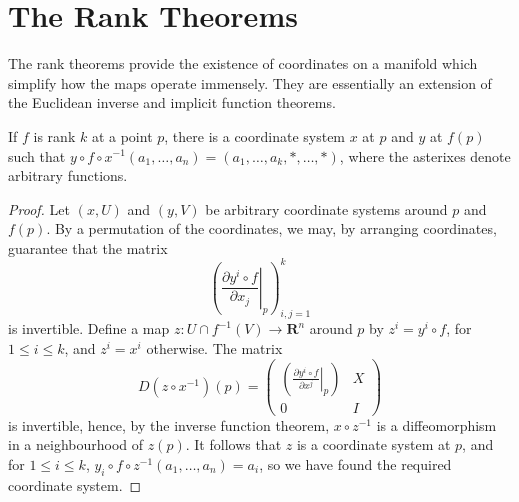 \section{The Rank Theorems}

The rank theorems provide the existence of coordinates on a manifold which simplify how the maps operate immensely. They are essentially an extension of the Euclidean inverse and implicit function theorems.

\begin{theorem}
    If $f$ is rank $k$ at a point $p$, there is a coordinate system $x$ at $p$ and $y$ at $f(p)$ such that $y \circ f \circ x^{-1}(a_1, \dots, a_n) = (a_1, \dots, a_k, *, \dots, *)$, where the asterixes denote arbitrary functions.
\end{theorem}
\begin{proof}
    Let $(x,U)$ and $(y,V)$ be arbitrary coordinate systems around $p$ and $f(p)$. By a permutation of the coordinates, we may, by arranging coordinates, guarantee that the matrix
    \[ \left( \left.\frac{\partial y^i \circ f}{\partial x_j}\right|_p \right)_{i,j = 1}^k \]
    is invertible. Define a map $z:U \cap f^{-1}(V) \to \mathbf{R}^n$ around $p$ by $z^i = y^i \circ f$, for $1 \leq i \leq k$, and $z^i = x^i$ otherwise. The matrix
    \[ D(z \circ x^{-1})(p) = \begin{pmatrix} \left( \left.\frac{\partial y^i \circ f}{\partial x^j}\right|_p \right) & X \\ 0 & I \end{pmatrix} \]
    is invertible, hence, by the inverse function theorem, $x \circ z^{-1}$ is a diffeomorphism in a neighbourhood of $z(p)$. It follows that $z$ is a coordinate system at $p$, and for $1 \leq i \leq k$, $y_i \circ f \circ z^{-1}(a_1, \dots, a_n) = a_i$, so we have found the required coordinate system.
\end{proof}

